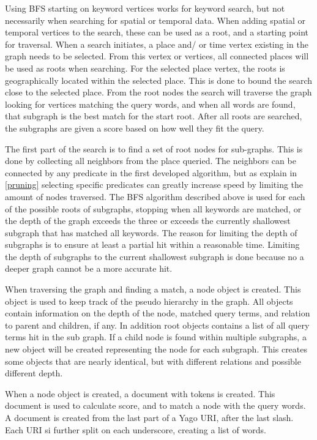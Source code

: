 Using BFS starting on keyword vertices works for keyword search, but not necessarily when searching for spatial or temporal data. When adding spatial or temporal vertices to the search, these can be used as a root, and a starting point for traversal. When a search initiates, a place and/ or time vertex existing in the graph needs to be selected. From this vertex or vertices, all connected places will be used as roots when searching. For the selected place vertex, the roots is geographically located within the selected place. This is done to bound the search close to the selected place. From the root nodes the search will traverse the graph looking for vertices matching the query words, and when all words are found, that subgraph is the best match for the start root. After all roots are searched, the subgraphs are given a score based on how well they fit the query.

The first part of the search is to find a set of root nodes for sub-graphs. This is done by collecting all neighbors from the place queried. The neighbors can be connected by any predicate in the first developed algorithm, but as explain in \ref{pruning} selecting specific predicates can greatly increase speed by limiting the amount of nodes traversed. The BFS algorithm described above is used for each of the possible roots of subgraphs, stopping when all keywords are matched, or the depth of the graph exceeds the three or exceeds the currently shallowest subgraph that has matched all keywords. The reason for limiting the depth of subgraphs is to ensure at least a partial hit within a reasonable time. Limiting the depth of subgraphs to the current shallowest subgraph is done because no a deeper graph cannot be a more accurate hit.

When traversing the graph and finding a match, a node object is created. This object is used to keep track of the pseudo hierarchy in the graph. All objects contain information on the depth of the node, matched query terms, and relation to parent and children, if any. In addition root objects contains a list of all query terms hit in the sub graph. If a child node is found within multiple subgraphs, a new object will be created representing the node for each subgraph. This creates some objects that are nearly identical, but with different relations and possible different depth.

When a node object is created, a document with tokens is created. This document is used to calculate score, and to match a node with the query words. A document is created from the last part of a Yago URI, after the last slash. Each URI si further split on each underscore, creating a list of words. 

